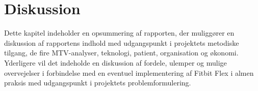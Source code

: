 \chapter{Diskussion}
Dette kapitel indeholder en opsummering af rapporten, der muliggører en diskussion af rapportens indhold med udgangspunkt i projektets metodiske tilgang, de fire MTV-analyser, teknologi, patient, organisation og økonomi. Yderligere vil det indeholde en diskussion af fordele, ulemper og mulige overvejelser i forbindelse med en eventuel implementering af Fitbit Flex i almen praksis med udgangspunkt i projektets problemformulering.







